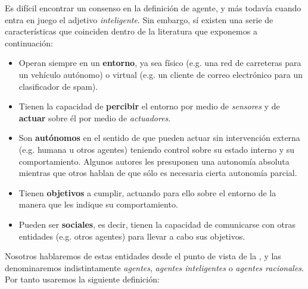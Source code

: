 Es difícil encontrar un consenso en la definición de agente, y más todavía cuando entra en juego el adjetivo \textit{inteligente}. Sin embargo, sí existen una serie de características que coinciden dentro de la literatura que exponemos a continuación:

\begin{itemize}
	\item Operan siempre en un \textbf{entorno}, ya sea físico (e.g. una red de carreteras para un vehículo autónomo) o virtual (e.g. un cliente de correo electrónico para un clasificador de spam).
	\item Tienen la capacidad de \textbf{percibir} el entorno por medio de \textit{sensores} y de \textbf{actuar} sobre él por medio de \textit{actuadores}.
	\item Son \textbf{autónomos} en el sentido de que pueden actuar sin intervención externa (e.g. humana u otros agentes) teniendo control sobre su estado interno y su comportamiento. Algunos autores les presuponen una autonomía absoluta mientras que otros hablan de que sólo es necesaria cierta autonomía parcial.
	\item Tienen \textbf{objetivos} a cumplir, actuando para ello sobre el entorno de la manera que les indique su comportamiento.
	\item Pueden ser \textbf{sociales}, es decir, tienen la capacidad de comunicarse con otras entidades (e.g. otros agentes) para llevar a cabo sus objetivos.
\end{itemize}

Nosotros hablaremos de estas entidades desde el punto de vista de la , y las denominaremos indistintamente \textit{agentes}, \textit{agentes inteligentes} o \textit{agentes racionales}. Por tanto usaremos la siguiente definición:

